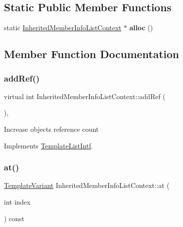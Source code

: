 \subsection*{Static Public Member Functions}
\begin{DoxyCompactItemize}
\item 
\mbox{\label{class_inherited_member_info_list_context_a4d180c5f0cfe5f540b9250fcd572d62c}} 
static \mbox{\hyperlink{class_inherited_member_info_list_context}{Inherited\+Member\+Info\+List\+Context}} $\ast$ {\bfseries alloc} ()
\end{DoxyCompactItemize}


\subsection{Member Function Documentation}
\mbox{\label{class_inherited_member_info_list_context_a367a16fa7a17f619910a40778da2af12}} 
\subsubsection{\texorpdfstring{addRef()}{addRef()}}
{\footnotesize\ttfamily virtual int Inherited\+Member\+Info\+List\+Context\+::add\+Ref (\begin{DoxyParamCaption}{ }\end{DoxyParamCaption})\hspace{0.3cm}{\ttfamily [inline]}, {\ttfamily [virtual]}}

Increase object\textquotesingle{}s reference count 

Implements \mbox{\hyperlink{class_template_list_intf_a4b4973e2e15396d10bc4e3085462ca2b}{Template\+List\+Intf}}.

\mbox{\label{class_inherited_member_info_list_context_aae1d20b1cb3ca2e5e5dfa9b13b734d79}} 
\subsubsection{\texorpdfstring{at()}{at()}}
{\footnotesize\ttfamily \mbox{\hyperlink{class_template_variant}{Template\+Variant}} Inherited\+Member\+Info\+List\+Context\+::at (\begin{DoxyParamCaption}\item[{int}]{index }\end{DoxyParamCaption}) const\hspace{0.3cm}{\ttfamily [virtual]}}

